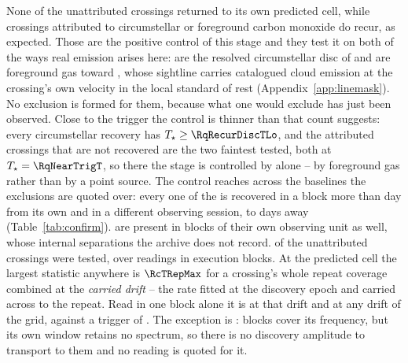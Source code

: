 None of the unattributed crossings returned to its own predicted cell, while
\MkAttrRecur{} crossings attributed to circumstellar or foreground carbon
monoxide do recur, as expected. Those \MkAttrRecur{} are the positive control of this stage and they
test it on both of the ways real emission arises here: \RqNRecurDisc{} are the
resolved circumstellar disc of \RqRecurDiscStars{} and \RqNRecurCloud{} are
foreground gas toward \RqRecurCloudStars, whose sightline carries catalogued
cloud emission at the crossing's own velocity in the local standard of rest
(Appendix~\ref{app:linemask}). No exclusion is formed for them, because what
one would exclude has just been observed. Close to the trigger the control is
thinner than that count suggests: every circumstellar recovery has
$T_\star\ge\RqRecurDiscTLo$, and the \RqNearTrigN{} attributed crossings that
are not recovered are the two faintest tested, both at
$T_\star=\RqNearTrigT$, so there the stage is controlled by
\RqRecurCloudStars{} alone -- by foreground gas rather than by a point
source. The control reaches across the baselines the exclusions are quoted
over: every one of the \QcNCtl{} is recovered in a block more than \EpSep{}
day from its own and in a different observing session, \QcSepMinD{} to
\QcSepMaxD{} days away (Table~\ref{tab:confirm}). \QcNUnrecWord{} are present
in blocks of their own observing unit as well, whose internal separations the
archive does not record. \RcNExclPoss{} of the \RcNTested{} unattributed crossings were tested,
over \RcNRepeatMeas{} readings in \RcNRepeatBlock{} execution blocks. At the
predicted cell the largest statistic anywhere is $\RcTRepMax$ for a crossing's
whole repeat coverage combined at the \emph{carried drift} -- the rate fitted
at the discovery epoch and carried across to the repeat. Read in one block
alone it is \RcTMatched{} at that drift and \RcTMax{} at any drift of the
grid, against a trigger of \StageNullTrig. The exception is \RcUntStar{} \texttt{\RcUntEb}:
\RcUntNRep{} blocks cover its frequency, but its own window retains no
spectrum, so there is no discovery amplitude to transport to them and no
reading is quoted for it.

